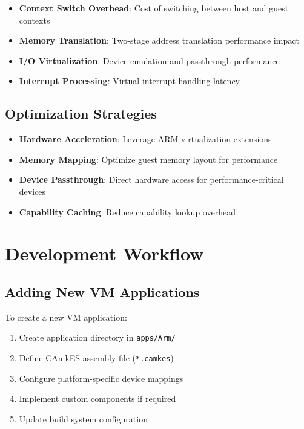 \documentclass[12pt,a4paper]{article}
\begin{document}
\begin{itemize}
    \item \textbf{Context Switch Overhead}: Cost of switching between host and guest contexts
    \item \textbf{Memory Translation}: Two-stage address translation performance impact
    \item \textbf{I/O Virtualization}: Device emulation and passthrough performance
    \item \textbf{Interrupt Processing}: Virtual interrupt handling latency
\end{itemize}

\subsection{Optimization Strategies}

\begin{itemize}
    \item \textbf{Hardware Acceleration}: Leverage ARM virtualization extensions
    \item \textbf{Memory Mapping}: Optimize guest memory layout for performance
    \item \textbf{Device Passthrough}: Direct hardware access for performance-critical devices
    \item \textbf{Capability Caching}: Reduce capability lookup overhead
\end{itemize}

\section{Development Workflow}

\subsection{Adding New VM Applications}

To create a new VM application:

\begin{enumerate}
    \item Create application directory in \texttt{apps/Arm/}
    \item Define CAmkES assembly file (\texttt{*.camkes})
    \item Configure platform-specific device mappings
    \item Implement custom components if required
    \item Update build system configuration
\end{enumerate}
\end{document}
